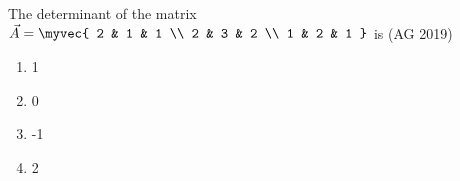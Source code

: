 \item The determinant of the matrix 
	$
\vec{A} = \myvec{ 2 & 1 & 1 \\ 2 & 3 & 2 \\ 1 & 2 & 1 }
$
is
\hfill{(AG 2019)}
\begin{multicols}{4}
\begin{enumerate}
    \item 1
    \item 0
    \item -1
    \item 2
\end{enumerate}
\end{multicols}

